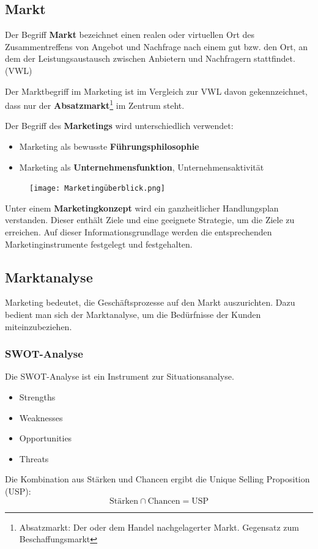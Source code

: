 \documentclass[12pt]{article}
\begin{document}
\subsection{Markt}
\begin{Definitionsbox}
    Der Begriff \textbf{Markt} bezeichnet einen realen oder virtuellen Ort des Zusammentreffens von Angebot und Nachfrage nach einem gut bzw. den Ort, an dem der Leistungsaustausch zwischen Anbietern und Nachfragern stattfindet. (VWL)
\end{Definitionsbox}
Der Marktbegriff im Marketing ist im Vergleich zur VWL davon gekennzeichnet, dass nur der \textbf{Absatzmarkt}\footnote{Absatzmarkt: Der oder dem Handel nachgelagerter Markt. \textrightarrow Gegensatz zum Beschaffungsmarkt} im Zentrum steht.
\begin{Definitionsbox}
    Der Begriff des \textbf{Marketings} wird unterschiedlich verwendet:
    \begin{itemize}
        \item Marketing als bewusste \textbf{Führungsphilosophie}
        \item Marketing als \textbf{Unternehmensfunktion}, Unternehmensaktivität
    \end{itemize}
\end{Definitionsbox}
\begin{figure}[h]
\begin{center}
        \texttt{[image: Marketingüberblick.png]}
\end{center}
\end{figure}
\begin{Definitionsbox}
    Unter einem \textbf{Marketingkonzept} wird ein ganzheitlicher Handlungsplan verstanden. Dieser enthält Ziele und eine geeignete Strategie, um die Ziele zu erreichen. Auf dieser Informationsgrundlage werden die entsprechenden Marketinginstrumente festgelegt und festgehalten.
\end{Definitionsbox}

\newpage
\subsection{Marktanalyse}
Marketing bedeutet, die Geschäftsprozesse auf den Markt auszurichten. Dazu bedient man sich der Marktanalyse, um die Bedürfnisse der Kunden miteinzubeziehen.

\subsubsection{SWOT-Analyse}
Die SWOT-Analyse ist ein Instrument zur Situationsanalyse.
\begin{itemize}
    \item Strengths
    \item Weaknesses
    \item Opportunities
    \item Threats
\end{itemize}
Die Kombination aus Stärken und Chancen ergibt die Unique Selling Proposition (USP):
\begin{equation*}
    \text{Stärken} \cap \text{Chancen} = \text{USP}
\end{equation*}
\end{document}
